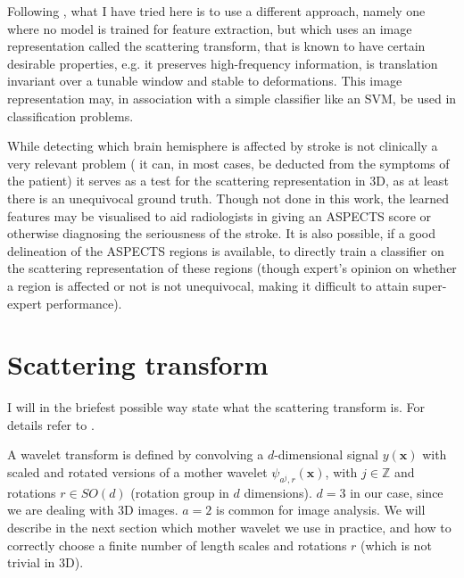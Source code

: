 \documentclass[twocolumn, openany, oneside, article]{memoir}
\begin{document}
Following \cite{adel2017scattering}, what I have tried here is to use a different approach, namely one where no model is trained for feature extraction, but
which uses an image representation called the scattering transform, that is known to have certain desirable properties,
e.g. it preserves high-frequency information, is translation invariant over a tunable window and stable to deformations.
This image representation may, in association with a simple classifier like an SVM, be used in classification problems.

While detecting which brain hemisphere is affected by stroke is not clinically a very relevant problem (
it can, in most cases, be deducted from the symptoms of the patient) it serves as a test for the scattering representation in 3D, as at
least there is an unequivocal ground truth. Though not done in this work, the learned features may be visualised to aid
radiologists in giving an ASPECTS score or otherwise diagnosing the seriousness of the stroke. It is also possible, if a
good delineation of the ASPECTS regions is available, to directly train a classifier on the scattering representation of
these regions (though expert's opinion on whether a region is affected or not is not unequivocal, making it difficult to
attain super-expert performance).

\chapter{Scattering transform}
I will in the briefest possible way state what the scattering transform is. For details
refer to \cite{anden2014deep, bruna2013invariant, bruna2013scattering}.

A wavelet transform is defined by convolving a $d$-dimensional signal $y(\bm{x})$ with scaled and rotated versions of a
mother wavelet $\psi_{a^j, r}(\bm{x})$, with $j \in \mathbb{Z}$ and rotations $r \in SO(d)$ (rotation group in $d$
dimensions). $d = 3$ in our case, since we are dealing with 3D images. $a = 2$ is common for image analysis. We will
describe in the next section which mother wavelet we use in practice, and how to correctly choose a finite number of
length scales and rotations $r$ (which is not trivial in 3D).
\end{document}
